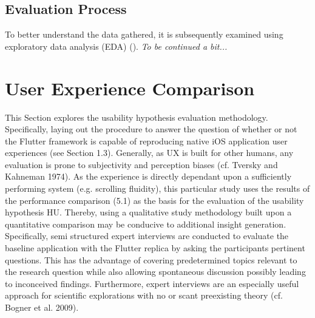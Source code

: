 \subsection{Evaluation Process} \label{subsection::evaluation_process}
To better understand the data gathered, it is subsequently examined using exploratory data
analysis (EDA) (\cite{Tukey1977}). \textit{To be continued a bit...}


\section{User Experience Comparison} \label{section::usability_comparison_design}
This Section explores the usability hypothesis evaluation methodology. Specifically, laying out
the procedure to answer the question of whether or not the Flutter framework is capable of
reproducing native iOS application user experiences (see Section 1.3).
Generally, as UX is built for other humans, any evaluation is prone to subjectivity and perception
biases (cf. Tversky and Kahneman 1974).
As the experience is directly dependant upon a sufficiently performing system (e.g. scrolling
fluidity), this particular study uses the results of the performance comparison (5.1) as the basis
for the evaluation of the usability hypothesis HU.
Thereby, using a qualitative study methodology built upon a quantitative comparison may
be conducive to additional insight generation.
Specifically, semi structured expert interviews are conducted to evaluate the baseline application
with the Flutter replica by asking the participants pertinent questions. This has the
advantage of covering predetermined topics relevant to the research question while also allowing
spontaneous discussion possibly leading to inconceived findings.
Furthermore, expert interviews are an especially useful approach for scientific explorations
with no or scant preexisting theory (cf. Bogner et al. 2009).